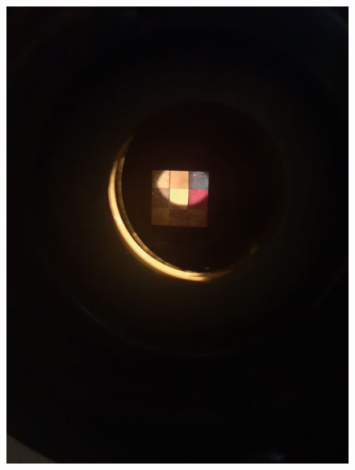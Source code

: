\documentclass[14pt, a4paper]{report}
\begin{document}
\begin{enumerate}
\begin{figure}[H]
\end{figure}
\begin{figure}[H]
\centering
\includegraphics[scale=0.2]{../images/473_9}
\end{figure}
\begin{figure}[H]
\centering

\end{figure}
\end{enumerate}
\end{document}
